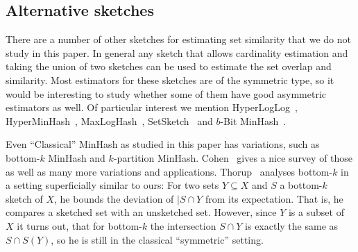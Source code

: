 
\subsection{Alternative sketches}

There are a number of other sketches for estimating set similarity that we do not study in this paper.
In general any sketch that allows cardinality estimation and taking the union of two sketches can be used to estimate the set overlap and similarity.
Most estimators for these sketches are of the symmetric type, so it would be interesting to study whether some of them have good asymmetric estimators as well.
Of particular interest we mention HyperLogLog~\cite{flajolet2007hyperloglog}, HyperMinHash~\cite{yu2020hyperminhash}, MaxLogHash~\cite{wang2019memory}, SetSketch~\cite{DBLP:journals/corr/abs-2101-00314} and $b$-Bit MinHash~\cite{li2010b}.

Even ``Classical'' MinHash as studied in this paper has variations, such as bottom-$k$ MinHash and $k$-partition MinHash. Cohen~\cite{DBLP:reference/algo/Cohen16b} gives a nice survey of those as well as many more variations and applications.
Thorup~\cite{thorup2013bottom} analyses bottom-$k$ in a setting superficially similar to ours: For two sets $Y\subseteq X$ and $S$ a bottom-$k$ sketch of $X$, he bounds the deviation of $|S\cap Y$ from its expectation.
That is, he compares a sketched set with an unsketched set.
However, since $Y$ is a subset of $X$ it turns out, that for bottom-$k$ the intersection $S\cap Y$ is exactly the same as $S\cap S(Y)$, so he is still in the classical ``symmetric'' setting.


